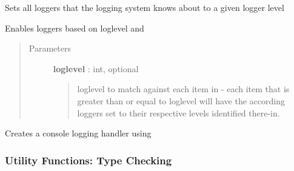 \documentclass[letterpaper,10pt,english]{sphinxmanual}
\begin{document}

\begin{fulllineitems}
\label{pytan.utils:pytan.utils.set_all_loglevels}
Sets all loggers that the logging system knows about to a given logger level

\end{fulllineitems}


\begin{fulllineitems}
\label{pytan.utils:pytan.utils.set_log_levels}
Enables loggers based on loglevel and {\hyperref[pytan.constants:pytan.constants.LOG_LEVEL_MAPS]{}}
\begin{quote}\begin{description}
\item[{Parameters}] \leavevmode
\textbf{loglevel} : int, optional
\begin{quote}

loglevel to match against each item in {\hyperref[pytan.constants:pytan.constants.LOG_LEVEL_MAPS]{}} - each item that is greater than or equal to loglevel will have the according loggers set to their respective levels identified there-in.
\end{quote}

\end{description}\end{quote}

\end{fulllineitems}


\begin{fulllineitems}
\label{pytan.utils:pytan.utils.setup_console_logging}
Creates a console logging handler using {\hyperref[pytan.utils:pytan.utils.SplitStreamHandler]{}}

\end{fulllineitems}



\subsubsection{Utility Functions: Type Checking}
\label{pytan.utils:utility-functions-type-checking}
\end{document}
